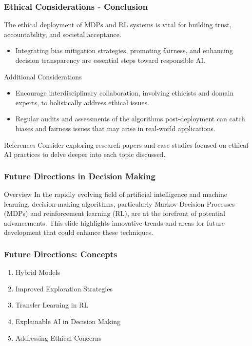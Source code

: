 \documentclass[aspectratio=169]{beamer}
\begin{document}
\begin{frame}[fragile]
    \frametitle{Ethical Considerations - Conclusion}
    The ethical deployment of MDPs and RL systems is vital for building trust, accountability, and societal acceptance. 
    \begin{itemize}
        \item Integrating bias mitigation strategies, promoting fairness, and enhancing decision transparency are essential steps toward responsible AI.
    \end{itemize}
    
    \begin{block}{Additional Considerations}
        \begin{itemize}
            \item Encourage interdisciplinary collaboration, involving ethicists and domain experts, to holistically address ethical issues.
            \item Regular audits and assessments of the algorithms post-deployment can catch biases and fairness issues that may arise in real-world applications.
        \end{itemize}
    \end{block}

    \begin{block}{References}
        Consider exploring research papers and case studies focused on ethical AI practices to delve deeper into each topic discussed.
    \end{block}
\end{frame}

\begin{frame}[fragile]
    \frametitle{Future Directions in Decision Making}
    \begin{block}{Overview}
        In the rapidly evolving field of artificial intelligence and machine learning, decision-making algorithms, particularly Markov Decision Processes (MDPs) and reinforcement learning (RL), are at the forefront of potential advancements. This slide highlights innovative trends and areas for future development that could enhance these techniques.
    \end{block}
\end{frame}

\begin{frame}[fragile]
    \frametitle{Future Directions: Concepts}
    \begin{enumerate}
        \item Hybrid Models
        \item Improved Exploration Strategies
        \item Transfer Learning in RL
        \item Explainable AI in Decision Making
        \item Addressing Ethical Concerns
    \end{enumerate}
\end{frame}
\end{document}
